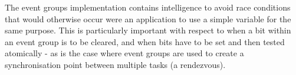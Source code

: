 The event groups implementation contains intelligence to avoid race conditions that would otherwise occur were an application to use a simple variable for the same purpose. This is particularly important with respect to when a bit within an event group is to be cleared, and when bits have to be set and then tested atomically -\/ as is the case where event groups are used to create a synchronisation point between multiple tasks (a \textquotesingle{}rendezvous\textquotesingle{}). 